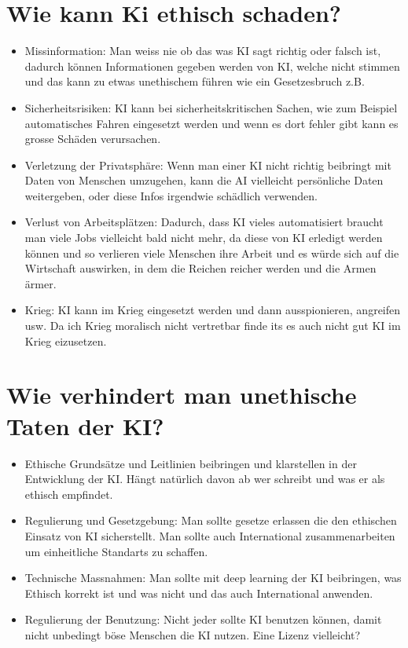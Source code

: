 \documentclass{report}
\begin{document}
\section{Wie kann Ki ethisch schaden?}
\begin{itemize}
    \item Missinformation: Man weiss nie ob das was KI sagt richtig oder falsch ist, dadurch können Informationen gegeben werden von KI, welche nicht stimmen und das kann zu etwas unethischem führen wie ein Gesetzesbruch z.B.
    \item Sicherheitsrisiken: KI kann bei sicherheitskritischen Sachen, wie zum Beispiel automatisches Fahren eingesetzt werden und wenn es dort fehler gibt kann es grosse Schäden verursachen.
    \item Verletzung der Privatsphäre: Wenn man einer KI nicht richtig beibringt mit Daten von Menschen umzugehen, kann die AI vielleicht persönliche Daten weitergeben, oder diese Infos irgendwie schädlich verwenden.
    \item Verlust von Arbeitsplätzen: Dadurch, dass KI vieles automatisiert braucht man viele Jobs vielleicht bald nicht mehr, da diese von KI erledigt werden können und so verlieren viele Menschen ihre Arbeit und es würde sich auf die Wirtschaft auswirken, in dem die Reichen reicher werden und die Armen ärmer.
    \item Krieg: KI kann im Krieg eingesetzt werden und dann ausspionieren, angreifen usw. Da ich Krieg moralisch nicht vertretbar finde its es auch nicht gut KI im Krieg eizusetzen.
\end{itemize}

\section{Wie verhindert man unethische Taten der KI?}
\begin{itemize}
    \item Ethische Grundsätze und Leitlinien beibringen und klarstellen in der Entwicklung der KI. Hängt natürlich davon ab wer schreibt und was er als ethisch empfindet.
    \item Regulierung und Gesetzgebung: Man sollte gesetze erlassen die den ethischen Einsatz von KI sicherstellt. Man sollte auch International zusammenarbeiten um einheitliche Standarts zu schaffen.
    \item Technische Massnahmen: Man sollte mit deep learning der KI beibringen, was Ethisch korrekt ist und was nicht und das auch International anwenden.
    \item Regulierung der Benutzung: Nicht jeder sollte KI benutzen können, damit nicht unbedingt böse Menschen die KI nutzen. Eine Lizenz vielleicht? 
\end{itemize}
\printbibliography
\end{document}
